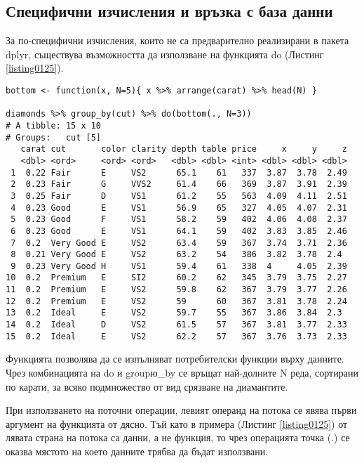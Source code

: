 \subsection{Специфични изчисления и връзка с база данни}

За по-специфични изчисления, които не са предварително реализирани в пакета dplyr, съществува възможността да използване на функцията do (Листинг \ref{listing0125}).

\begin{lstlisting}[caption=Специфични изчисления, label=listing0125]
bottom <- function(x, N=5){ x %>% arrange(carat) %>% head(N) }
 
diamonds %>% group_by(cut) %>% do(bottom(., N=3))
# A tibble: 15 x 10
# Groups:   cut [5]
   carat cut       color clarity depth table price     x     y     z
   <dbl> <ord>     <ord> <ord>   <dbl> <dbl> <int> <dbl> <dbl> <dbl>
 1  0.22 Fair      E     VS2      65.1    61   337  3.87  3.78  2.49
 2  0.23 Fair      G     VVS2     61.4    66   369  3.87  3.91  2.39
 3  0.25 Fair      D     VS1      61.2    55   563  4.09  4.11  2.51
 4  0.23 Good      E     VS1      56.9    65   327  4.05  4.07  2.31
 5  0.23 Good      F     VS1      58.2    59   402  4.06  4.08  2.37
 6  0.23 Good      E     VS1      64.1    59   402  3.83  3.85  2.46
 7  0.2  Very Good E     VS2      63.4    59   367  3.74  3.71  2.36
 8  0.21 Very Good E     VS2      63.2    54   386  3.82  3.78  2.4 
 9  0.23 Very Good H     VS1      59.4    61   338  4     4.05  2.39
10  0.2  Premium   E     SI2      60.2    62   345  3.79  3.75  2.27
11  0.2  Premium   E     VS2      59.8    62   367  3.79  3.77  2.26
12  0.2  Premium   E     VS2      59      60   367  3.81  3.78  2.24
13  0.2  Ideal     E     VS2      59.7    55   367  3.86  3.84  2.3 
14  0.2  Ideal     D     VS2      61.5    57   367  3.81  3.77  2.33
15  0.2  Ideal     E     VS2      62.2    57   367  3.76  3.73  2.33
\end{lstlisting}

Функцията позволява да се изпълняват потребителски функции върху данните. Чрез комбинацията на do и groupю\_by се връщат най-долните N реда, сортирани по карати, за всяко подмножество от вид срязване на диамантите. 

При използването на поточни операции, левият операнд на потока се явява първи аргумент на функцията от дясно. Тъй като в примера (Листинг \ref{listing0125}) от лявата страна на потока са данни, а не функция, то чрез операцията точка (.) се оказва мястото на което данните трябва да бъдат използвани.

